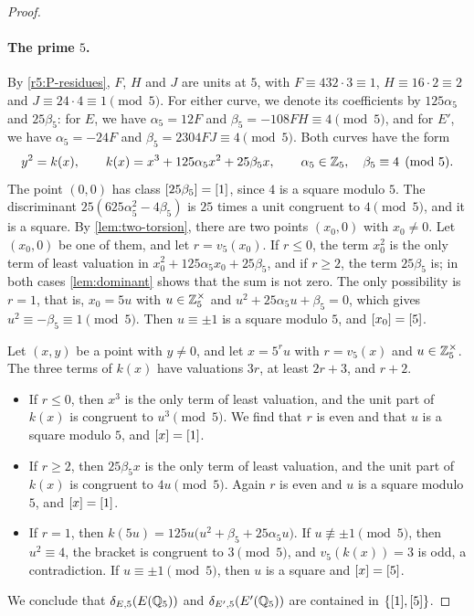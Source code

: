 \begin{proof}
\paragraph{The prime $5$.} By \eqref{r5:P-residues}, $F$, $H$ and $J$ are units at $5$, with $F\equiv432\cdot3\equiv1$, $H\equiv16\cdot2\equiv2$ and $J\equiv24\cdot4\equiv1\pmod5$. For either curve, we denote its coefficients by $125\alpha_5$ and $25\beta_5$: for $E$, we have $\alpha_5=12F$ and $\beta_5=-108FH\equiv4\pmod5$, and for $E'$, we have $\alpha_5=-24F$ and $\beta_5=2304FJ\equiv4\pmod5$. Both curves have the form
\[
y^2=k(x),\qquad k(x)=x^3+125\alpha_5x^2+25\beta_5x,\qquad \alpha_5\in\mathbb Z_5,\quad\beta_5\equiv4\pmod5.
\]
The point $(0,0)$ has class $[25\beta_5]=[1]$, since $4$ is a square modulo $5$. The discriminant $25(625\alpha_5^2-4\beta_5)$ is $25$ times a unit congruent to $4\pmod5$, and it is a square. By \cref{lem:two-torsion}, there are two points $(x_0,0)$ with $x_0\ne0$. Let $(x_0,0)$ be one of them, and let $r=v_5(x_0)$. If $r\le0$, the term $x_0^2$ is the only term of least valuation in $x_0^2+125\alpha_5x_0+25\beta_5$, and if $r\ge2$, the term $25\beta_5$ is; in both cases \cref{lem:dominant} shows that the sum is not zero. The only possibility is $r=1$, that is, $x_0=5u$ with $u\in\mathbb Z_5^\times$ and $u^2+25\alpha_5u+\beta_5=0$, which gives $u^2\equiv-\beta_5\equiv1\pmod5$. Then $u\equiv\pm1$ is a square modulo $5$, and $[x_0]=[5]$.

Let $(x,y)$ be a point with $y\ne0$, and let $x=5^ru$ with $r=v_5(x)$ and $u\in\mathbb Z_5^\times$. The three terms of $k(x)$ have valuations $3r$, at least $2r+3$, and $r+2$.
\begin{itemize}
\item If $r\le0$, then $x^3$ is the only term of least valuation, and the unit part of $k(x)$ is congruent to $u^3\pmod5$. We find that $r$ is even and that $u$ is a square modulo $5$, and $[x]=[1]$.
\item If $r\ge2$, then $25\beta_5x$ is the only term of least valuation, and the unit part of $k(x)$ is congruent to $4u\pmod5$. Again $r$ is even and $u$ is a square modulo $5$, and $[x]=[1]$.
\item If $r=1$, then $k(5u)=125u\big(u^2+\beta_5+25\alpha_5u\big)$. If $u\not\equiv\pm1\pmod5$, then $u^2\equiv4$, the bracket is congruent to $3\pmod5$, and $v_5(k(x))=3$ is odd, a contradiction. If $u\equiv\pm1\pmod5$, then $u$ is a square and $[x]=[5]$.
\end{itemize}
We conclude that $\delta_{E,5}(E(\mathbb Q_5))$ and $\delta_{E',5}(E'(\mathbb Q_5))$ are contained in $\{[1],[5]\}$.


\end{proof}
